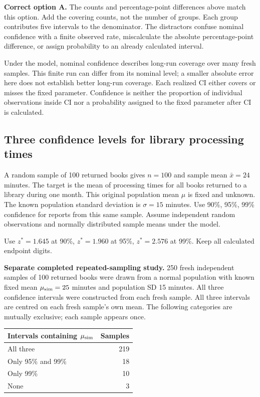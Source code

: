 \textbf{Correct option A.} The counts and percentage-point differences above match this option. Add the covering counts, not the number of groups. Each group contributes five intervals to the denominator. The distractors confuse nominal confidence with a finite observed rate, miscalculate the absolute percentage-point difference, or assign probability to an already calculated interval.

Under the model, nominal confidence describes long-run coverage over many fresh samples. This finite run can differ from its nominal level; a smaller absolute error here does not establish better long-run coverage. Each realized $\mathrm{CI}$ either covers or misses the fixed parameter. Confidence is neither the proportion of individual observations inside $\mathrm{CI}$ nor a probability assigned to the fixed parameter after $\mathrm{CI}$ is calculated.
\par\nopagebreak[4]
\par\vspace{3mm}
\clearpage
\subsection{Three confidence levels for library processing times}
\label{prob:c2-compare-three}

A random sample of 100 returned books gives $n=100$ and sample mean $\bar{x}=24$ minutes. The target is the mean of processing times for all books returned to a library during one month. This original population mean $\mu$ is fixed and unknown. The known population standard deviation is $\sigma=15$ minutes. Use 90\%, 95\%, 99\% confidence for reports from this same sample. Assume independent random observations and normally distributed sample means under the model.

Use $z^*=1.645$ at 90\%, $z^*=1.960$ at 95\%, $z^*=2.576$ at 99\%. Keep all calculated endpoint digits.

\textbf{Separate completed repeated-sampling study.} 250 fresh independent samples of 100 returned books were drawn from a normal population with known fixed mean $\mu_{\rm sim}=25$ minutes and population SD 15 minutes. All three confidence intervals were constructed from each fresh sample.
All three intervals are centred on each fresh sample's own mean. The following categories are mutually exclusive; each sample appears once.
\begin{center}\begin{tabular}{@{}lr@{}}\toprule
Intervals containing $\mu_{\rm sim}$ & Samples\\\midrule
All three & 219 \\[6pt]
Only 95\% and 99\% & 18 \\[6pt]
Only 99\% & 10 \\[6pt]
None & 3 \\[6pt]
\bottomrule\end{tabular}\end{center}

